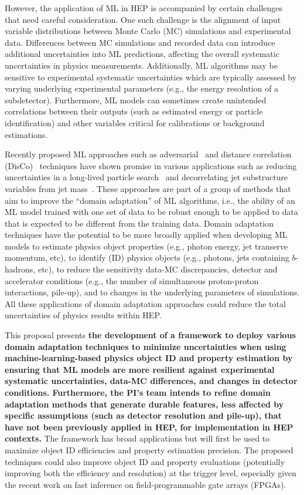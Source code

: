 \documentclass[letter, USenglish, 11pt, subfigure]{article}
\begin{document}
However, the application of ML in HEP is accompanied by certain challenges that need careful consideration. One such challenge is the alignment of input variable distributions between Monte Carlo (MC) simulations and experimental data. Differences between MC simulations and recorded data can introduce additional uncertainties into ML predictions, affecting the overall systematic uncertainties in physics measurements. Additionally, ML algorithms may be sensitive to experimental systematic uncertainties which are typically assessed by varying underlying experimental parameters (e.g., the energy resolution of a subdetector). Furthermore, ML models can sometimes create unintended correlations between their outputs (such as estimated energy or particle identification) and other variables critical for calibrations or background estimations.

Recently proposed ML approaches such as adversarial~\cite{louppe2017learning} and distance correlation (DisCo)~\cite{PhysRevLett.125.122001} techniques have shown promise in various applications such as reducing uncertainties in a long-lived particle search~\cite{calRatio} and decorrelating jet substructure variables from jet mass~\cite{ATL-PHYS-PUB-2018-014}.
These approaches are part of a group of methods that aim to improve the ``domain adaptation'' of ML algorithms, i.e., the ability of an ML model trained with one set of data to be robust enough to be applied to data that is expected to be different from the training data. Domain adaptation techniques have the potential to be more broadly applied when developing ML models to estimate physics object properties (e.g., photon energy, jet transerve momentum, etc), to identify (ID) physics objects (e.g., photons, jets containing $b$-hadrons, etc), to reduce the sensitivity data-MC discrepancies, detector and accelerator conditions (e.g., the number of simultaneous proton-proton interactions, pile-up), and to changes in the underlying parameters of simulations. All these applications of domain adaptation approaches could reduce the total uncertainties of physics results within HEP. 

This proposal presents {\bf the development of a framework to deploy various domain adaptation techniques to minimize uncertainties when using machine-learning-based physics object ID and property estimation by ensuring that ML models are more resilient against experimental systematic uncertainties, data-MC differences, and changes in detector conditions. Furthermore, the PI's team intends to refine domain adaptation methods that generate durable features, less affected by specific assumptions (such as detector resolution and pile-up), that have not been previously applied in HEP, for implementation in HEP contexts. } The framework has broad applications but will first be used to maximize object ID efficiencies and property estimation precision. The proposed techniques could also improve object ID and property evaluations (potentially improving both the efficiency and resolution) at the trigger level, especially given the recent work on fast inference on field-programmable gate arrays (FPGAs).
\end{document}
